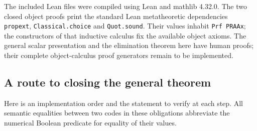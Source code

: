 The included Lean files were compiled using Lean and mathlib 4.32.0.
The two closed object proofs print the standard Lean metatheoretic
dependencies \texttt{propext}, \texttt{Classical.choice} and
\texttt{Quot.sound}. Their values inhabit \texttt{Prf PRAAx};
the constructors of that inductive calculus fix the available
object axioms. The general scalar presentation and the elimination
theorem here have human proofs; their complete object-calculus proof
generators remain to be implemented.

\subsection{A route to closing the general theorem}
Here is an implementation order and the statement to verify at each step.
All semantic equalities between two codes in these obligations abbreviate
the numerical Boolean predicate for equality of their values.
